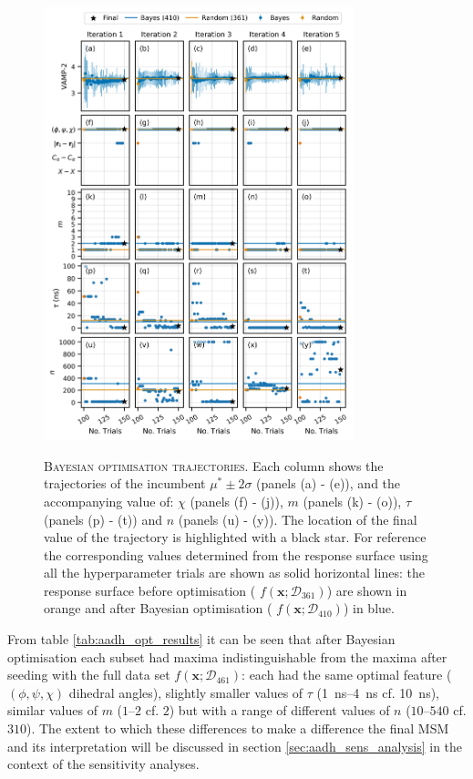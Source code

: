 \begin{figure}[p]
    \centering
    \caption[Bayesian optimisation trajectories]{\textsc{Bayesian optimisation trajectories}. Each column shows the trajectories of the incumbent $\mu^{*} \pm  2\sigma$ (panels (a) - (e)), and the accompanying value of: $\chi$ (panels (f) - (j)), $m$ (panels (k) - (o)), $\tau$ (panels (p) - (t)) and $n$ (panels (u) - (y)). The location of the final value of the trajectory is highlighted with a black star. For reference the corresponding values determined from the response surface using all the hyperparameter trials are shown as solid horizontal lines: the response surface before optimisation ( $f\left(\mathbf{x}; \mathcal{D}_{361}\right)$) are shown in orange and after Bayesian optimisation ( $f\left(\mathbf{x}; \mathcal{D}_{410}\right)$) in blue.}
    \includegraphics[width=0.8\textwidth]{chapters/msm_optimization/figures/aadh_opt_traj_act_s_d.png}
    \label{fig:aadh_opt_traj_d}
\end{figure}

From  table \ref{tab:aadh_opt_results} it can be seen that after Bayesian optimisation each subset had maxima indistinguishable from the maxima after seeding with the full data set $f\left(\mathbf{x};\mathcal{D}_{461}\right)$: each had the same optimal feature ($(\phi, \psi, \chi)$ dihedral angles), slightly smaller values of $\tau$ (\SIrange{1}{4}{\nano\second} cf. \SI{10}{\nano\second}), similar values of $m$ ($\numrange[range-phrase=\text{--}]{1}{2}$ cf. $2$) but with a range of different values of $n$ ($\numrange[range-phrase=\text{--}]{10}{540}$ cf. $310$). The extent to which these differences to make a difference the final MSM and its interpretation will be discussed in section \ref{sec:aadh_sens_analysis} in the context of the sensitivity analyses.

